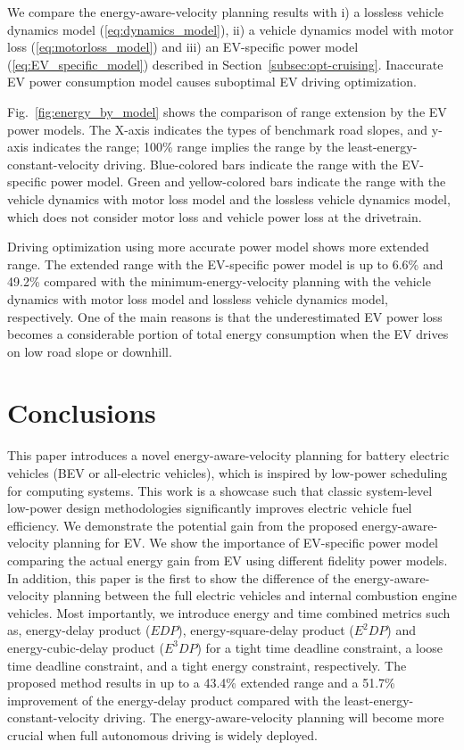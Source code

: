 \documentclass{IEEEtran}
\begin{document}
We compare the energy-aware-velocity planning results with i) a lossless vehicle dynamics model (\ref{eq:dynamics_model}), ii) a vehicle dynamics model with motor loss (\ref{eq:motorloss_model}) and iii) an EV-specific power model (\ref{eq:EV_specific_model}) described in Section~\ref{subsec:opt-cruising}. Inaccurate EV power consumption model causes suboptimal EV driving optimization.

Fig.~\ref{fig:energy_by_model} shows the comparison of range extension by the EV power models. The X-axis indicates the types of benchmark road slopes, and y-axis indicates the range; 100\%  range implies the range by the least-energy-constant-velocity driving. Blue-colored bars indicate the range with the EV-specific power model. Green and yellow-colored bars indicate the range with the vehicle dynamics with motor loss model and the lossless vehicle dynamics model, which does not consider motor loss and vehicle power loss at the drivetrain.

Driving optimization using more accurate power model shows more extended range. The extended range with the EV-specific power model is up to 6.6\% and 49.2\% compared with the minimum-energy-velocity planning with the vehicle dynamics with motor loss model and lossless vehicle dynamics model, respectively. One of the main reasons is that the underestimated EV power loss becomes a considerable portion of total energy consumption when the EV drives on low road slope or downhill.

\section{Conclusions} \label{sec:conclusions}

This paper introduces a novel energy-aware-velocity planning for battery electric vehicles (BEV or all-electric vehicles), which is inspired by low-power scheduling for computing systems. This work is a showcase such that classic system-level  low-power design methodologies significantly improves electric vehicle fuel efficiency. We demonstrate the potential gain from the proposed energy-aware-velocity planning for EV. We show the importance of EV-specific power model  comparing the actual energy gain from EV using different fidelity power models. In addition, this paper is the first to show the difference of the energy-aware-velocity planning between the full electric vehicles and internal combustion engine vehicles. Most importantly, we introduce energy and time combined metrics such as, energy-delay product ($EDP$), energy-square-delay product ($E^2DP$) and energy-cubic-delay product ($E^3DP$) for a tight time deadline constraint, a loose time deadline constraint, and a tight energy constraint, respectively. 
The proposed method results in up to a 43.4\% extended range and a  51.7\% improvement of the energy-delay product compared with the least-energy-constant-velocity driving. 
The energy-aware-velocity planning will become more crucial when full autonomous driving is widely deployed.
\end{document}
